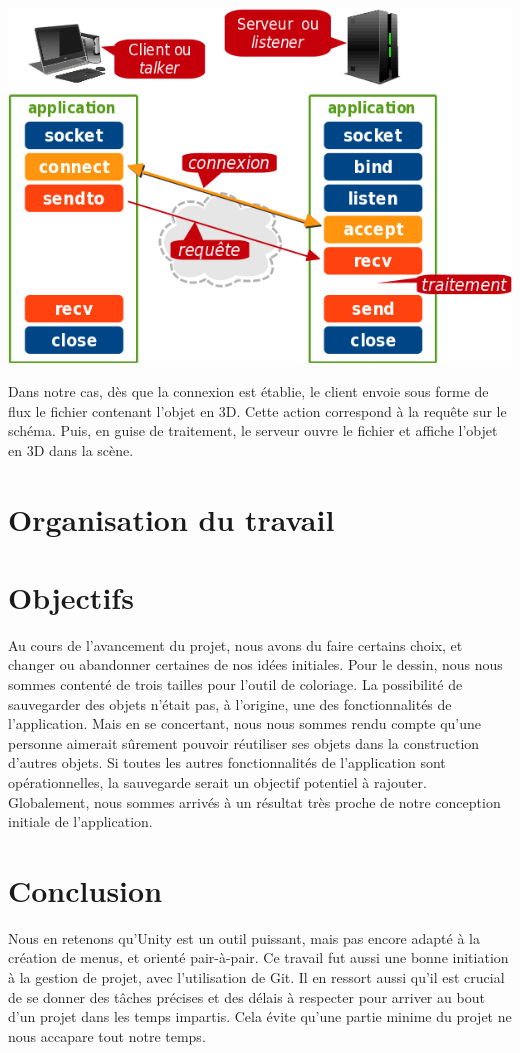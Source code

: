 \documentclass[a4paper,11pt]{article}
\begin{document}
			\centerline{\includegraphics[scale=1]{images/tcp-socket.png}}
			
			Dans notre cas, dès que la connexion est établie, le client envoie sous forme de flux le fichier contenant l'objet en 3D. Cette action correspond à la requête sur le schéma. Puis, en guise de traitement, le serveur ouvre le fichier et affiche l'objet en 3D dans la scène.
			
	\section{Organisation du travail}
	\section{Objectifs}
		Au cours de l'avancement du projet, nous avons du faire certains choix, et changer ou abandonner certaines de nos idées initiales.
		Pour le dessin, nous nous sommes contenté de trois tailles pour l'outil de coloriage.
		La possibilité de sauvegarder des objets n'était pas, à l'origine, une des fonctionnalités de l'application. Mais en se concertant, nous nous sommes rendu compte qu'une personne aimerait sûrement pouvoir réutiliser ses objets dans la construction d'autres objets. Si toutes les autres fonctionnalités de l'application sont opérationnelles, la sauvegarde serait un objectif potentiel à rajouter.
		Globalement, nous sommes arrivés à un résultat très proche de notre conception initiale de l'application.
	\section{Conclusion}
			Nous en retenons qu'Unity est un outil puissant, mais pas encore adapté à la création de menus, et orienté pair-à-pair. Ce travail fut aussi une bonne initiation à la gestion de projet, avec l'utilisation de Git. Il en ressort aussi qu'il est crucial de se donner des tâches précises et des délais à respecter pour arriver au bout d'un projet dans les temps impartis. Cela évite qu'une partie minime du projet ne nous accapare tout notre temps.
			
\end{document}

